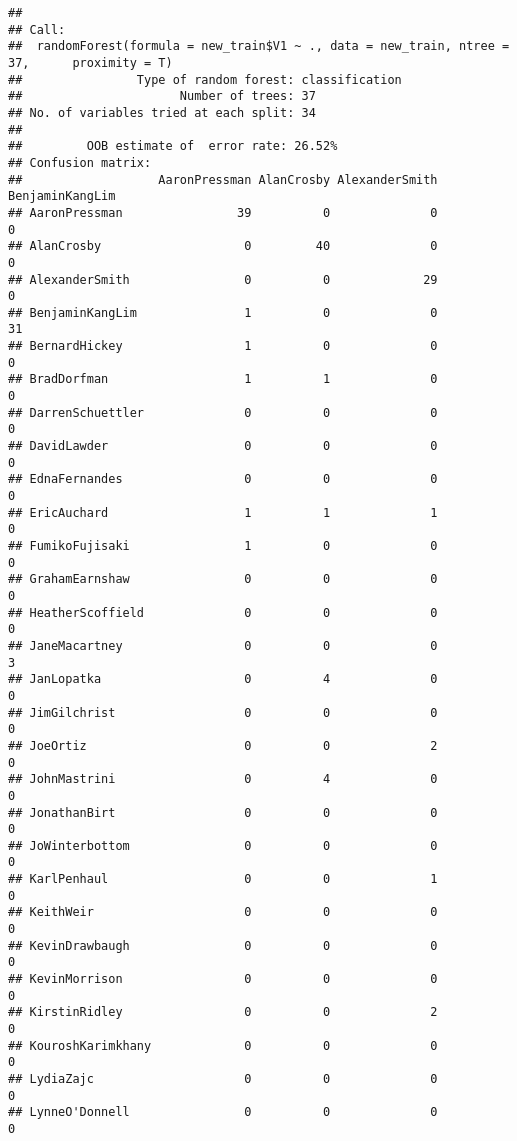 \documentclass[
  12pt,
]{article}
\begin{document}
\begin{verbatim}
## 
## Call:
##  randomForest(formula = new_train$V1 ~ ., data = new_train, ntree = 37,      proximity = T) 
##                Type of random forest: classification
##                      Number of trees: 37
## No. of variables tried at each split: 34
## 
##         OOB estimate of  error rate: 26.52%
## Confusion matrix:
##                   AaronPressman AlanCrosby AlexanderSmith BenjaminKangLim
## AaronPressman                39          0              0               0
## AlanCrosby                    0         40              0               0
## AlexanderSmith                0          0             29               0
## BenjaminKangLim               1          0              0              31
## BernardHickey                 1          0              0               0
## BradDorfman                   1          1              0               0
## DarrenSchuettler              0          0              0               0
## DavidLawder                   0          0              0               0
## EdnaFernandes                 0          0              0               0
## EricAuchard                   1          1              1               0
## FumikoFujisaki                1          0              0               0
## GrahamEarnshaw                0          0              0               0
## HeatherScoffield              0          0              0               0
## JaneMacartney                 0          0              0               3
## JanLopatka                    0          4              0               0
## JimGilchrist                  0          0              0               0
## JoeOrtiz                      0          0              2               0
## JohnMastrini                  0          4              0               0
## JonathanBirt                  0          0              0               0
## JoWinterbottom                0          0              0               0
## KarlPenhaul                   0          0              1               0
## KeithWeir                     0          0              0               0
## KevinDrawbaugh                0          0              0               0
## KevinMorrison                 0          0              0               0
## KirstinRidley                 0          0              2               0
## KouroshKarimkhany             0          0              0               0
## LydiaZajc                     0          0              0               0
## LynneO'Donnell                0          0              0               0

\end{verbatim}
\end{document}
